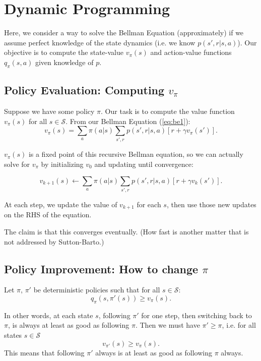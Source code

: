\documentclass{article}
\begin{document}
\section{Dynamic Programming}
Here, we consider a way to solve the Bellman Equation (approximately) if we assume perfect knowledge of the state dynamics (i.e. we know $p(s',r|s,a)$). Our objective is to compute the state-value $v_\pi(s)$ and action-value functions $q_\pi(s,a)$ given knowledge of $p$.

\subsection{Policy Evaluation: Computing $v_\pi$}

Suppose we have some policy $\pi$. Our task is to compute the value function $v_\pi(s)$ for all $s\in \mathcal{S}$. From our Bellman Equation (\ref{eq:be1}):
\begin{equation}
    v_\pi(s) = \sum_a \pi(a|s) \sum_{s',r} p(s',r|s,a) [r+\gamma v_\pi(s')].
\end{equation}

\begin{claim}
$v_\pi(s)$ is a fixed point of this recursive Bellman equation, so we can actually solve for $v_\pi$ by initializing $v_0$ and updating until convergence:

\begin{equation}
    v_{k+1}(s) \leftarrow \sum_a \pi(a|s) \sum_{s',r} p(s',r|s,a) [r+\gamma v_k(s')]. \label{eq:ipe}
\end{equation}

At each step, we update the value of $v_{k+1}$ for each $s$, then use those new updates on the RHS of the equation.

The claim is that this converges eventually. (How fast is another matter that is not addressed by Sutton-Barto.)
\end{claim}

\subsection{Policy Improvement: How to change $\pi$}
\begin{theorem}
Let $\pi$, $\pi'$ be deterministic policies such that for all $s\in\mathcal{S}$:
\begin{equation}
    q_\pi(s,\pi'(s)) \ge v_\pi(s).
\end{equation}

In other words, at each state $s$, following $\pi'$ for one step, then switching back to $\pi$, is always at least as good as following $\pi$. Then we must have $\pi'\ge \pi$, i.e. for all states $s\in\mathcal{S}$
\begin{equation}
    v_{\pi'}(s) \ge v_\pi(s).
\end{equation}
This means that following $\pi'$ always is at least as good as following $\pi$ always.
\end{theorem}
\end{document}
